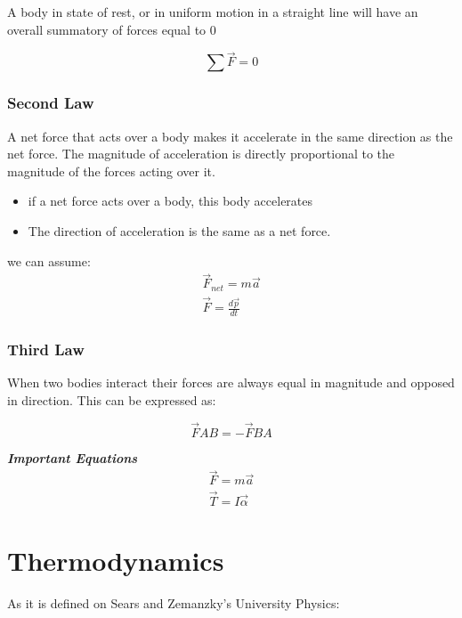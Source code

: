 \documentclass[11pt,fleqn]{book} %
\begin{document}
A body in state of rest, or in uniform motion in a straight line
will have an overall summatory of forces equal to 0

\begin{equation}
    \sum \vec{F} = 0
\end{equation}

\subsection{Second Law}

A net force that acts over a body makes it accelerate in the same direction
as the net force. The magnitude of acceleration is directly proportional
to the magnitude of the forces acting over it.

\begin{itemize}
    \item if a net force acts over a body, this body accelerates
    \item The direction of acceleration is the same as a net force.
\end{itemize}

we can assume:
\begin{gather}
    \vec{F}_{net} = m \vec{a} \\
    \vec{F} = \frac{d \vec{p}}{dt} 
\end{gather}

\subsection{Third Law}

When two bodies interact their forces are always equal in magnitude and
opposed in direction. This can be expressed as:

\begin{equation}
    \vec{F} AB = - \vec{F} BA
\end{equation}

\textit{\textbf{Important Equations}}
\begin{gather}
    \vec{F} = m\vec{a}\\
    \vec{T} = I\vec{\alpha}
\end{gather}

\chapter{Thermodynamics}

As it is defined on Sears and Zemanzky's University Physics:
\end{document}
